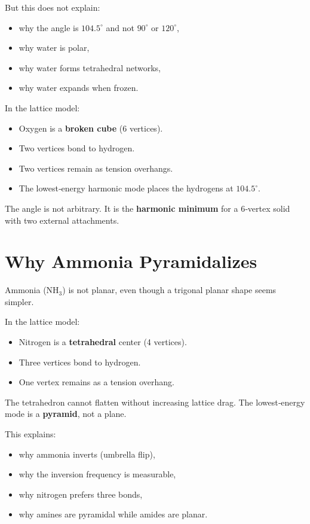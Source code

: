 \documentclass[11pt, letterpaper, openany]{book}
\begin{document}
But this does not explain:

\begin{itemize}
    \item why the angle is $104.5^\circ$ and not $90^\circ$ or $120^\circ$,
    \item why water is polar,
    \item why water forms tetrahedral networks,
    \item why water expands when frozen.
\end{itemize}

In the lattice model:

\begin{itemize}
    \item Oxygen is a \textbf{broken cube} (6 vertices).
    \item Two vertices bond to hydrogen.
    \item Two vertices remain as tension overhangs.
    \item The lowest‑energy harmonic mode places the hydrogens at $104.5^\circ$.
\end{itemize}

The angle is not arbitrary. It is the \textbf{harmonic minimum} for a 6‑vertex solid with two
external attachments.

\section{Why Ammonia Pyramidalizes}

Ammonia (NH$_3$) is not planar, even though a trigonal planar shape seems simpler.

In the lattice model:

\begin{itemize}
    \item Nitrogen is a \textbf{tetrahedral} center (4 vertices).
    \item Three vertices bond to hydrogen.
    \item One vertex remains as a tension overhang.
\end{itemize}

The tetrahedron cannot flatten without increasing lattice drag. The lowest‑energy mode is
a \textbf{pyramid}, not a plane.

This explains:

\begin{itemize}
    \item why ammonia inverts (umbrella flip),
    \item why the inversion frequency is measurable,
    \item why nitrogen prefers three bonds,
    \item why amines are pyramidal while amides are planar.
\end{itemize}
\end{document}
